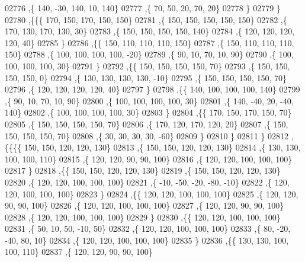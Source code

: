 \begin{DoxyCode}
02776     ,\{   140,   -30,   140,    10,   140\}
02777     ,\{    70,    50,    20,    70,    20\}
02778     \}
02779    \}
02780   ,\{\{\{   170,   150,   170,   150,   150\}
02781     ,\{   150,   150,   150,   150,   150\}
02782     ,\{   170,   130,   170,   130,    30\}
02783     ,\{   150,   150,   150,   150,   140\}
02784     ,\{   120,   120,   120,   120,    40\}
02785     \}
02786    ,\{\{   150,   110,   110,   110,   150\}
02787     ,\{   150,   110,   110,   110,   150\}
02788     ,\{   100,   100,   100,   100,   -20\}
02789     ,\{    90,    10,    70,    10,    90\}
02790     ,\{   100,   100,   100,   100,    30\}
02791     \}
02792    ,\{\{   150,   150,   150,   150,    70\}
02793     ,\{   150,   150,   150,   150,     0\}
02794     ,\{   130,   130,   130,   130,   -10\}
02795     ,\{   150,   150,   150,   150,    70\}
02796     ,\{   120,   120,   120,   120,    40\}
02797     \}
02798    ,\{\{   140,   100,   100,   100,   140\}
02799     ,\{    90,    10,    70,    10,    90\}
02800     ,\{   100,   100,   100,   100,    30\}
02801     ,\{   140,   -40,    20,   -40,   140\}
02802     ,\{   100,   100,   100,   100,    30\}
02803     \}
02804    ,\{\{   170,   150,   170,   150,    70\}
02805     ,\{   150,   150,   150,   150,    70\}
02806     ,\{   170,   120,   170,   120,    20\}
02807     ,\{   150,   150,   150,   150,    70\}
02808     ,\{    30,    30,    30,    30,   -60\}
02809     \}
02810    \}
02811   \}
02812  ,\{\{\{\{   150,   150,   120,   120,   130\}
02813     ,\{   150,   150,   120,   120,   130\}
02814     ,\{   130,   130,   100,   100,   110\}
02815     ,\{   120,   120,    90,    90,   100\}
02816     ,\{   120,   120,   100,   100,   100\}
02817     \}
02818    ,\{\{   150,   150,   120,   120,   130\}
02819     ,\{   150,   150,   120,   120,   130\}
02820     ,\{   120,   120,   100,   100,   100\}
02821     ,\{   -10,   -50,   -20,   -80,   -10\}
02822     ,\{   120,   120,   100,   100,   100\}
02823     \}
02824    ,\{\{   120,   120,   100,   100,   100\}
02825     ,\{   120,   120,    90,    90,   100\}
02826     ,\{   120,   120,   100,   100,   100\}
02827     ,\{   120,   120,    90,    90,   100\}
02828     ,\{   120,   120,   100,   100,   100\}
02829     \}
02830    ,\{\{   120,   120,   100,   100,   100\}
02831     ,\{    50,    10,    50,   -10,    50\}
02832     ,\{   120,   120,   100,   100,   100\}
02833     ,\{    80,   -20,   -40,    80,    10\}
02834     ,\{   120,   120,   100,   100,   100\}
02835     \}
02836    ,\{\{   130,   130,   100,   100,   110\}
02837     ,\{   120,   120,    90,    90,   100\}

\end{DoxyCode}
